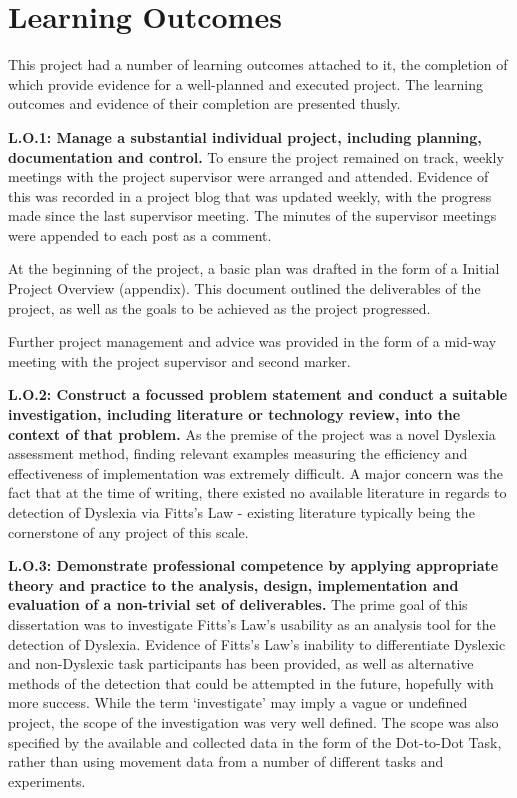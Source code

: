 		\newpage
		
	\section{Learning Outcomes}
		This project had a number of learning outcomes attached to it, the completion of which provide evidence for a well-planned and executed project. The learning outcomes and evidence of their completion are presented thusly.
		
		\textbf{L.O.1: Manage a substantial individual project, including planning, documentation and control.}
		To ensure the project remained on track, weekly meetings with the project supervisor were arranged and attended. Evidence of this was recorded in a project blog that was updated weekly, with the progress made since the last supervisor meeting. The minutes of the supervisor meetings were appended to each post as a comment.
		
		At the beginning of the project, a basic plan was drafted in the form of a Initial Project Overview (appendix). This document outlined the deliverables of the project, as well as the goals to be achieved as the project progressed. 
		
		Further project management and advice was provided in the form of a mid-way meeting with the project supervisor and second marker.
		
		\textbf{L.O.2: Construct a focussed problem statement and conduct a suitable investigation, including literature or technology review, into the context of that problem.}
		As the premise of the project was a novel Dyslexia assessment method, finding relevant examples measuring the efficiency and effectiveness of implementation was extremely difficult. A major concern was the fact that at the time of writing, there existed no available literature in regards to detection of Dyslexia via Fitts’s Law - existing literature typically being the cornerstone of any project of this scale.
		
		\textbf{L.O.3: Demonstrate professional competence by applying appropriate theory and practice to the analysis, design, implementation and evaluation of a non-trivial set of deliverables.}
		The prime goal of this dissertation was to investigate Fitts’s Law’s usability as an analysis tool for the detection of Dyslexia. Evidence of Fitts’s Law’s inability to differentiate Dyslexic and non-Dyslexic task participants has been provided, as well as alternative methods of the detection that could be attempted in the future, hopefully with more success. While the term ‘investigate’ may imply a vague or undefined project, the scope of the investigation was very well defined. The scope was also specified by the available and collected data in the form of the Dot-to-Dot Task, rather than using movement data from a number of different tasks and experiments. 
		
